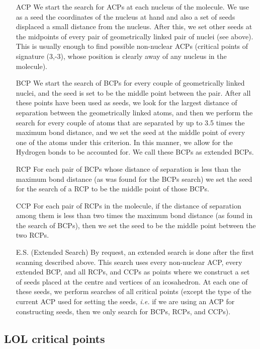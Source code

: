 \begin{itemize}
\item[ACP] We start the search for ACPs at each nucleus of the molecule. We use as a seed the 
  coordinates of the nucleus at hand and also a set of seeds displaced a small distance from
  the nucleus. After this, we set other seeds at the midpoints of every pair of 
  geometrically linked pair of nuclei (see above). This is usually enough to find possible
  non-nuclear ACPs (critical points of signature (3,-3), whose position is clearly away
  of any nucleus in the molecule).
\item[BCP] We start the search of BCPs for every couple of geometrically linked nuclei, and the seed
  is set to be the middle point between the pair. After all these points have been used as seeds,
  we look for the largest distance of separation between the geometrically linked atoms,
  and then we perform the search for every couple of atoms that are separated by up to 3.5
  times the maximum bond distance, and we set the seed at the middle point of every one of
  the atoms under this criterion. In this manner, we allow for the Hydrogen bonds
  to be accounted for. We call these BCPs as extended BCPs.
\item[RCP] For each pair of BCPs whose distance of separation is less than the maximum bond distance (as was found for the BCPs search) we set the seed for the search of a RCP to be the middle point of those BCPs.
\item[CCP] For each pair of RCPs in the molecule, if the distance of separation among them is less than two times the maximum bond distance (as found in the search of BCPs), then we set the seed to be the middle point between the two RCPs.
\item [E.S.] (Extended Search) By request, an extended search is done after the first scanning described 
  above. This search uses every non-nuclear ACP, every extended BCP, and all RCPs, and CCPs as 
  points where we construct a set of seeds placed at the centre and vertices of an
  icosahedron. At each one of these seeds, we perform searches of all critical points (except the
  type of the current ACP used for setting the seeds, \textit{i.e.} if we are using an ACP for 
  constructing seeds, then we only search for BCPs, RCPs, and CCPs).
\end{itemize}

\subsection{LOL critical points}

